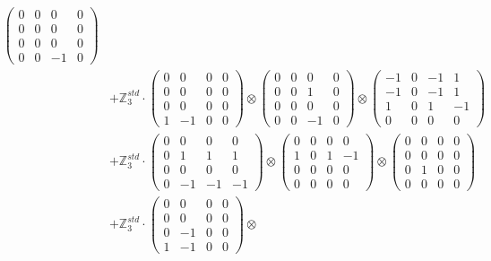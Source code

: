 \documentclass{article}
\begin{document}
{\begin{align}
            \begin{pmatrix} 0 & 0 & 0 & 0 \\ 0 & 0 & 0 & 0 \\ 0 & 0 & 0 & 0 \\ 0 & 0 & -1 & 0 \end{pmatrix} \\ 
        &+ \label{Rs16-Rc11-Solution-17-c25} \mathbb{Z}_3^{std} \cdot 
            \begin{pmatrix} 0 & 0 & 0 & 0 \\ 0 & 0 & 0 & 0 \\ 0 & 0 & 0 & 0 \\ 1 & -1 & 0 & 0 \end{pmatrix} \otimes 
            \begin{pmatrix} 0 & 0 & 0 & 0 \\ 0 & 0 & 1 & 0 \\ 0 & 0 & 0 & 0 \\ 0 & 0 & -1 & 0 \end{pmatrix} \otimes 
            \begin{pmatrix} -1 & 0 & -1 & 1 \\ -1 & 0 & -1 & 1 \\ 1 & 0 & 1 & -1 \\ 0 & 0 & 0 & 0 \end{pmatrix} \\ 
        &+ \label{Rs16-Rc11-Solution-17-c26} \mathbb{Z}_3^{std} \cdot 
            \begin{pmatrix} 0 & 0 & 0 & 0 \\ 0 & 1 & 1 & 1 \\ 0 & 0 & 0 & 0 \\ 0 & -1 & -1 & -1 \end{pmatrix} \otimes 
            \begin{pmatrix} 0 & 0 & 0 & 0 \\ 1 & 0 & 1 & -1 \\ 0 & 0 & 0 & 0 \\ 0 & 0 & 0 & 0 \end{pmatrix} \otimes 
            \begin{pmatrix} 0 & 0 & 0 & 0 \\ 0 & 0 & 0 & 0 \\ 0 & 1 & 0 & 0 \\ 0 & 0 & 0 & 0 \end{pmatrix} \\ 
        &+ \label{Rs16-Rc11-Solution-17-c27} \mathbb{Z}_3^{std} \cdot 
            \begin{pmatrix} 0 & 0 & 0 & 0 \\ 0 & 0 & 0 & 0 \\ 0 & -1 & 0 & 0 \\ 1 & -1 & 0 & 0 \end{pmatrix} \otimes 

\end{align}}
\end{document}
